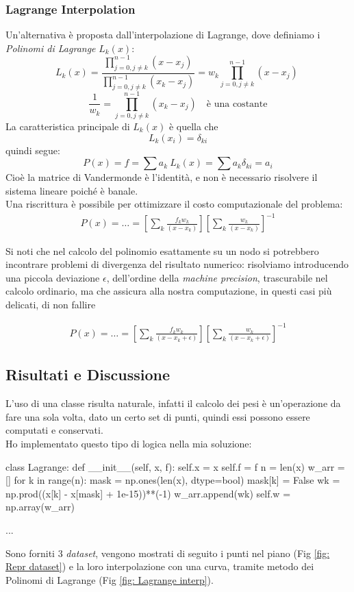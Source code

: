\subsubsection{Lagrange Interpolation}
Un'alternativa è proposta dall'interpolazione di Lagrange, dove definiamo i \textit{Polinomi di Lagrange} $L_k(x)$:
\[
L_k(x) = \frac{\prod_{j=0, j \neq k}^{n-1}(x - x_j)}{\prod_{j=0, j \neq k}^{n-1}(x_k - x_j)} = w_k \prod_{j=0, j \neq k}^{n-1}(x - x_j)\
\]
\[
\frac{1}{w_k} = \prod_{j=0, j \neq k}^{n-1}(x_k - x_j) \quad \text{è una costante}
\]
La caratteristica principale di $L_k(x)$ è quella che 
\[
L_k(x_i) = \delta_{ki}
\]
quindi segue:
\[
P(x) = f = \sum a_k\ L_k(x) = \sum a_k \delta_{ki} = a_i
\]
Cioè la matrice di Vandermonde è l'identità, e non è necessario risolvere il sistema lineare poiché è banale. \\
Una riscrittura è possibile per ottimizzare il costo computazionale del problema:
\[
\begin{aligned}
P(x) = \dots = \left[ \sum_{k} \frac{f_k w_k}{(x - x_k)} \right] \left[ \sum_{k} \frac{w_k}{(x - x_k)} \right]^{-1}
\end{aligned}
\]

\noindent Si noti che nel calcolo del polinomio esattamente su un nodo si potrebbero incontrare problemi di divergenza del risultato numerico: risolviamo introducendo una piccola deviazione $\epsilon$, dell'ordine della \textit{machine precision}, trascurabile nel calcolo ordinario, ma che assicura alla nostra computazione, in questi casi più delicati, di non fallire

\[
\begin{aligned}
P(x) = \dots = \left[ \sum_{k} \frac{f_k w_k}{(x - x_k + \epsilon)} \right] \left[ \sum_{k} \frac{w_k}{(x - x_k + \epsilon)} \right]^{-1}
\end{aligned}
\]

\subsection{Risultati e Discussione}
L'uso di una classe risulta naturale, infatti il calcolo dei pesi è un'operazione da fare una sola volta, dato un certo set di punti, quindi essi possono essere computati e conservati.\\
Ho implementato questo tipo di logica nella mia soluzione:
\begin{elegantcode}
class Lagrange:
    def __init__(self, x, f):
        self.x = x
        self.f = f
        n = len(x)
        w_arr = []
        for k in range(n):
            mask = np.ones(len(x), dtype=bool)
            mask[k] = False
            wk = np.prod((x[k] - x[mask] + 1e-15))**(-1)
            w_arr.append(wk)
        self.w = np.array(w_arr)

    ...
\end{elegantcode}
\bigskip
\noindent Sono forniti 3 \textit{dataset}, vengono mostrati di seguito i punti nel piano (Fig \ref{fig: Repr dataset}) e la loro interpolazione con una curva, tramite metodo dei Polinomi di Lagrange (Fig \ref{fig: Lagrange interp}).

